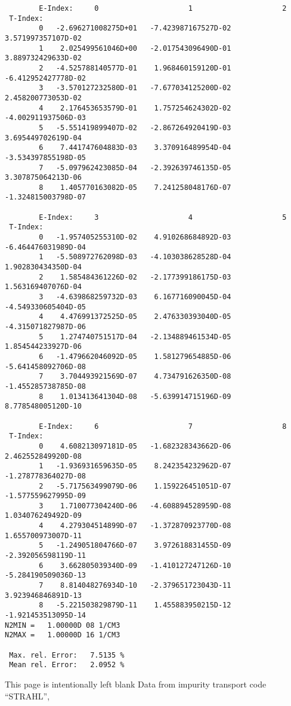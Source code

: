\documentclass[12pt,dvipdfmx]{article}
\begin{document}
\begin{small}\begin{verbatim}
        E-Index:     0                     1                     2
 T-Index:
        0   -2.696271008275D+01   -7.423987167527D-02    3.571997357107D-02
        1    2.025499561046D+00   -2.017543096490D-01    3.889732429633D-02
        2   -4.525788140577D-01    1.968460159120D-01   -6.412952427778D-02
        3   -3.570127232580D-01   -7.677034125200D-02    2.458200773053D-02
        4    2.176453653579D-01    1.757254624302D-02   -4.002911937506D-03
        5   -5.551419899407D-02   -2.867264920419D-03    3.695449702619D-04
        6    7.441747604883D-03    3.370916489954D-04   -3.534397855198D-05
        7   -5.097962423085D-04   -2.392639746135D-05    3.307875064213D-06
        8    1.405770163082D-05    7.241258048176D-07   -1.324815003798D-07

        E-Index:     3                     4                     5
 T-Index:
        0   -1.957405255310D-02    4.910268684892D-03   -6.464476031989D-04
        1   -5.508972762098D-03   -4.103038628528D-04    1.902830434350D-04
        2    1.585484361226D-02   -2.177399186175D-03    1.563169407076D-04
        3   -4.639868259732D-03    6.167716090045D-04   -4.549330605404D-05
        4    4.476991372525D-05    2.476330393040D-05   -4.315071827987D-06
        5    1.274740751517D-04   -2.134889461534D-05    1.854544233927D-06
        6   -1.479662046092D-05    1.581279654885D-06   -5.641458092706D-08
        7    3.704493921569D-07    4.734791626350D-08   -1.455285738785D-08
        8    1.013413641304D-08   -5.639914715196D-09    8.778548005120D-10

        E-Index:     6                     7                     8
 T-Index:
        0    4.608213097181D-05   -1.682328343662D-06    2.462552849920D-08
        1   -1.936931659635D-05    8.242354232962D-07   -1.278778364027D-08
        2   -5.717563499079D-06    1.159226451051D-07   -1.577559627995D-09
        3    1.710077304240D-06   -4.608894528959D-08    1.034076249492D-09
        4    4.279304514899D-07   -1.372870923770D-08    1.655700973007D-11
        5   -1.249051804766D-07    3.972618831455D-09   -2.392056598119D-11
        6    3.662805039340D-09   -1.410127247126D-10   -5.284190509036D-13
        7    8.814048276934D-10   -2.379651723043D-11    3.923946846891D-13
        8   -5.221503829879D-11    1.455883950215D-12   -1.921453513095D-14
N2MIN =   1.00000D 08 1/CM3
N2MAX =   1.00000D 16 1/CM3

 Max. rel. Error:   7.5135 %
 Mean rel. Error:   2.0952 %

\end{verbatim}\end{small}
\newpage
This page is intentionally left blank
\newpage
Data from impurity transport code ``STRAHL'', \cite{kn:Behringer}
\end{document}
